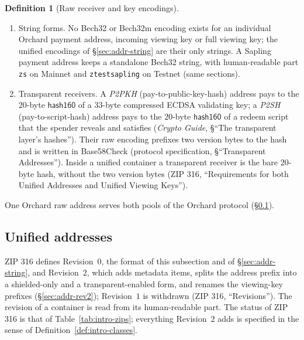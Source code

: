 \documentclass[11pt,a4paper]{article}
\theoremstyle{definition}
\newtheorem{definition}[theorem]{Definition}
\begin{document}
\begin{definition}[Raw receiver and key encodings]
\begin{enumerate}[label=(\alph*)]
\item String forms. No Bech32 or Bech32m encoding exists for an individual
  Orchard payment address, incoming viewing key or full viewing key; the
  unified encodings of \S\ref{sec:addr-string} are their only strings. A
  Sapling payment address keeps a standalone Bech32 string, with
  human-readable part \texttt{zs} on Mainnet and \texttt{ztestsapling} on
  Testnet (same sections).
\item Transparent receivers. A \emph{P2PKH} (pay-to-public-key-hash)
  address pays to the $20$-byte $\mathsf{hash160}$ of a $33$-byte compressed
  ECDSA validating key; a \emph{P2SH} (pay-to-script-hash) address pays to
  the $20$-byte $\mathsf{hash160}$ of a redeem script that the spender
  reveals and satisfies (\emph{Crypto Guide}, \S``The transparent layer's
  hashes''). Their raw encoding prefixes two version bytes to the hash and
  is written in Base58Check (protocol specification, \S``Transparent
  Addresses''). Inside a unified container a transparent receiver is the
  bare $20$-byte hash, without the two version bytes (ZIP 316,
  ``Requirements for both Unified Addresses and Unified Viewing Keys'').
\end{enumerate}
\end{definition}

One Orchard raw address serves both pools of the Orchard protocol
(\S\ref{sec:addr-ua}).

\subsection{Unified addresses}\label{sec:addr-ua}

ZIP 316 defines Revision~$0$, the format of this subsection and of
\S\ref{sec:addr-string}, and Revision~$2$, which adds metadata items,
splits the address prefix into a shielded-only and a transparent-enabled
form, and renames the viewing-key prefixes (\S\ref{sec:addr-rev2});
Revision~$1$ is withdrawn (ZIP 316, ``Revisions''). The revision of a
container is read from its human-readable part. The status of ZIP 316 is
that of Table~\ref{tab:intro-zips}; everything Revision~$2$ adds is
specified in the sense of Definition~\ref{def:intro-classes}.
\end{document}
